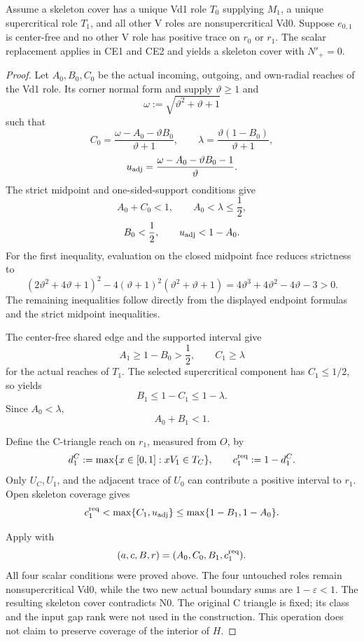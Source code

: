 \begin{proposition}
\label{prop:appendix-vd1-two-chart-replacement}
Assume a skeleton cover has a unique Vd1 role $T_0$ supplying $M_1$, a
unique supercritical role $T_1$, and all other V roles are nonsupercritical
Vd0. Suppose $e_{0,1}$ is center-free and no other V role has positive
trace on $r_0$ or $r_1$. The scalar replacement applies in CE1 and CE2
and yields a skeleton cover with $N'_+=0$.
\end{proposition}

\begin{proof}
Let \(A_0,B_0,C_0\) be the actual incoming, outgoing, and own-radial
reaches of the Vd1 role.  Its corner normal form and  supply
\(\vartheta\ge1\) and
\[
 \omega:=\sqrt{\vartheta^2+\vartheta+1}
\]
such that
\[
 C_0=\frac{\omega-A_0-\vartheta B_0}{\vartheta+1},
 \qquad
 \lambda=\frac{\vartheta(1-B_0)}{\vartheta+1},
\]
\[
 u_{\rm adj}
 =\frac{\omega-A_0-\vartheta B_0-1}{\vartheta}.
\]
The strict midpoint and one-sided-support conditions give
\[
 A_0+C_0<1,
 \qquad
 A_0<\lambda\le\frac12,
\]
\[
 B_0<\frac12,
 \qquad
 u_{\rm adj}<1-A_0.
\]
For the first inequality, evaluation on the closed midpoint face reduces
strictness to
\[
 (2\vartheta^2+4\vartheta+1)^2
 -4(\vartheta+1)^2(\vartheta^2+\vartheta+1)
 =4\vartheta^3+4\vartheta^2-4\vartheta-3>0.
\]
The remaining inequalities follow directly from the displayed endpoint
formulas and the strict midpoint inequalities.

The center-free shared edge and the supported interval give
\[
 A_1\ge1-B_0>\frac12,
 \qquad
 C_1\ge\lambda
\]
for the actual reaches of \(T_1\).  The selected supercritical component
has \(C_1\le1/2\), so
 yields
\[
 B_1\le1-C_1\le1-\lambda.
\]
Since \(A_0<\lambda\),
\[
 A_0+B_1<1.
\]

Define the C-triangle reach on \(r_1\), measured from \(O\), by
\[
 d_1^C:=\max\{x\in[0,1]:xV_1\in T_C\},
 \qquad
 c_1^{\rm req}:=1-d_1^C.
\]
Only \(U_C,U_1\), and the adjacent trace of \(U_0\) can contribute a
positive interval to \(r_1\).  Open skeleton coverage gives
\[
 c_1^{\rm req}<\max\{C_1,u_{\rm adj}\}
 \le\max\{1-B_1,1-A_0\}.
\]

Apply  with
\[
 (a,c,B,r)=(A_0,C_0,B_1,c_1^{\rm req}).
\]
All four scalar conditions were proved above. The four untouched roles
remain nonsupercritical Vd0, while the two new actual boundary sums are
$1-\varepsilon<1$. The resulting skeleton cover contradicts N0.
The original C triangle is fixed; its class and the input gap rank were
not used in the construction. This operation does not claim to preserve
coverage of the interior of $H$.
\end{proof}

